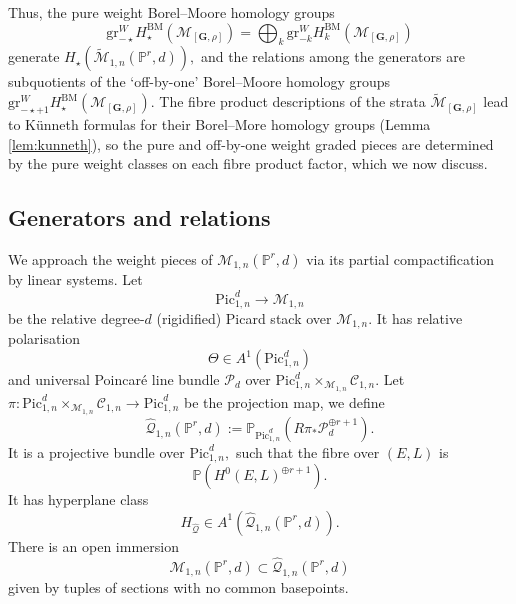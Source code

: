 \documentclass[12pt,reqno]{amsart}
\theoremstyle{definition}
\theoremstyle{definition}
\theoremstyle{definition}
\theoremstyle{definition}
\newcommand{\PP}{\mathbb{P}}
\newcommand{\Mtil}{\widetilde{\mathcal{M}}}
\begin{document}
Thus, the pure weight Borel--Moore homology groups $$\mathrm{gr}^W_{-\star }H_{\star}^{\mathrm{BM}}(\mathcal{M}_{[\mathbf{G},\rho]}) = \bigoplus_{k} \mathrm{gr}^W_{-k }H_{k}^{\mathrm{BM}}(\mathcal{M}_{[\mathbf{G},\rho]})$$ generate $H_\star(\Mtil_{1,n}(\PP^r,d)),$ and the relations among the generators are subquotients of the `off-by-one' Borel--Moore homology groups $\mathrm{gr}^W_{-\star+1} H_\star^{\mathrm{BM}}(\mathcal{M}_{[\mathbf{G},\rho]}).$ The fibre product descriptions of the strata $\Mtil_{[\mathbf{G},\rho]}$ lead to Künneth formulas for their Borel--More homology groups (Lemma \ref{lem:kunneth}), so the pure and off-by-one weight graded pieces are determined by the pure weight classes on each fibre product factor, which we now discuss.




\subsection{Generators and relations}\label{sec:introgenrel}

We approach the weight pieces of $\mathcal{M}_{1,n}(\PP^r,d)$ via its partial compactification by linear systems. Let $$\mathrm{Pic}^d_{1,n}\to \mathcal{M}_{1,n}$$ be the relative degree-$d$ (rigidified) Picard stack over $\mathcal{M}_{1,n}.$ It has relative polarisation $$\Theta\in A^1(\mathrm{Pic}^d_{1,n})$$ and universal Poincaré line bundle $\mathcal{P}_d$ over $\mathrm{Pic}^d_{1,n}\times_{\mathcal{M}_{1,n}} \mathcal{C}_{1,n}.$ Let $\pi: \mathrm{Pic}^d_{1,n}\times_{\mathcal{M}_{1,n}} \mathcal{C}_{1,n}\to \mathrm{Pic}^d_{1,n}$ be the projection map, we define $$\hat{\mathcal{Q}}_{1,n}(\PP^r,d):=\mathbb{P}_{\mathrm{Pic}^d_{1,n}}(R\pi_* \mathcal{P}_d^{\oplus r+1}).$$ It is a projective bundle over $\mathrm{Pic}^d_{1,n},$ such that the fibre over $(E,L)$ is $$\mathbb{P}(H^0(E, L)^{\oplus r+1}).$$ It has hyperplane class $$H_{\hat{\mathcal{Q}}}\in A^1(\hat{\mathcal{Q}}_{1,n}(\PP^r,d)).$$ There is an open immersion $$\mathcal{M}_{1,n}(\PP^r,d)\subset \hat{\mathcal{Q}}_{1,n}(\PP^r,d)$$ given by tuples of sections with no common basepoints.
\end{document}
